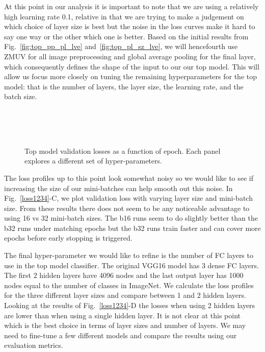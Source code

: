 \documentclass[12pt,journal,compsoc]{IEEEtran}
\begin{document}
At this point in our analysis it is important to note that we are using a relatively high learning rate 0.1, relative in that we are trying to make a judgement on which choice of layer size is best but the noise in the loss curves make it hard to say one way or the other which one is better. Based on the initial results from Fig.~\ref{fig:top_pp_pl_lve} and~\ref{fig:top_pl_sz_lve}, we will hencefourth use ZMUV for all image preprocessing and global average pooling for the final layer, which consequently defines the shape of the input to our our top model. This will allow us focus more closely on tuning the remaining hyperparameters for the top model: that is the number of layers, the layer size, the learning rate, and the batch size.


\begin{figure}[!t]
\normalsize
{} \\
 \\
 \\
\caption{Top model validation losses as a function of epoch. Each panel explores a different set of hyper-parameters.}
\label{fig:top2_nl_sz_lr}
\vspace*{4pt}
\end{figure}



The loss profiles up to this point look somewhat noisy so we would like to see if increasing the size of our mini-batches can help smooth out this noise.  In Fig.~\ref{loss1234}-C, we plot validation loss with varying layer size and mini-batch size.  From these results there does not seem to be any noticeable advantage to using 16 vs 32 mini-batch sizes.  The b16 runs seem to do slightly better than the b32 runs under matching epochs but the b32 runs train faster and can cover more epochs before early stopping is triggered.

The final hyper-parameter we would like to refine is the number of FC layers to use in the top model classifier.  The original VGG16 model has 3 dense FC layers. The first 2 hidden layers have 4096 nodes and the last output layer has 1000 nodes equal to the number of classes in ImageNet. We calculate the loss profiles for the three different layer sizes and compare between 1 and 2 hidden layers.  Looking at the results of Fig.~\ref{loss1234}-D the losses when using 2 hidden layers are lower than when using a single hidden layer.  It is not clear at this point which is the best choice in terms of layer sizes and number of layers.  We may need to fine-tune a few different models and compare the results using our evaluation metrics. 
\end{document}

